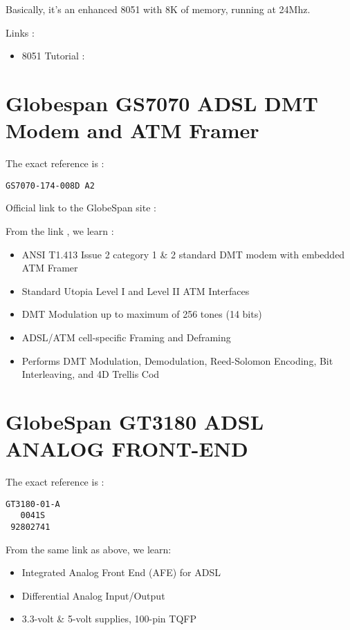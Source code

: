 \documentclass[a4paper,12pt]{article}
\begin{document}
Basically, it's an enhanced 8051 with 8K of memory, running at 24Mhz.

Links :
\begin{itemize}
\item 8051 Tutorial :
\end{itemize}

\section{Globespan GS7070 ADSL DMT Modem and ATM Framer}

The exact reference is :
\begin{verbatim}
GS7070-174-008D A2
\end{verbatim}

Official link to the GlobeSpan site : 

From the link , we learn :
\begin{itemize}
\item ANSI T1.413 Issue 2 category 1 \& 2 standard DMT modem with
embedded ATM Framer
\item Standard Utopia Level I and Level II ATM Interfaces
\item DMT Modulation up to maximum of 256 tones (14 bits)
\item ADSL/ATM cell-specific Framing and Deframing
\item Performs DMT Modulation, Demodulation, Reed-Solomon Encoding,
Bit Interleaving, and 4D Trellis Cod
\end{itemize}



\section{GlobeSpan GT3180 ADSL ANALOG FRONT-END}

The exact reference is :
\begin{verbatim}
GT3180-01-A
   0041S
 92802741
\end{verbatim}

From the same link as above, we learn:
\begin{itemize}
\item Integrated Analog Front End (AFE) for ADSL
\item Differential Analog Input/Output
\item 3.3-volt \& 5-volt supplies, 100-pin TQFP
\end{itemize}
\end{document}
